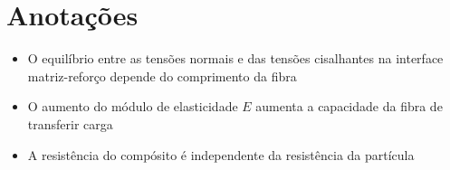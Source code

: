 
\section*{Anotações}

\begin{multicols*}{2}

\begin{itemize}
  \item O equilíbrio entre as tensões normais e das tensões cisalhantes na interface matriz-reforço depende do comprimento da fibra
  \item O aumento do módulo de elasticidade $E$ aumenta a capacidade da fibra de transferir carga
  \item A resistência do compósito é independente da resistência da partícula
\end{itemize}

\end{multicols*}
